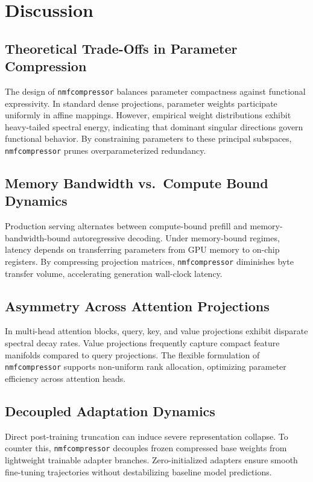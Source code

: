 \section{Discussion}

\subsection{Theoretical Trade-Offs in Parameter Compression}
The design of \texttt{nmfcompressor} balances parameter compactness against functional expressivity. In standard dense projections, parameter weights participate uniformly in affine mappings. However, empirical weight distributions exhibit heavy-tailed spectral energy, indicating that dominant singular directions govern functional behavior. By constraining parameters to these principal subspaces, \texttt{nmfcompressor} prunes overparameterized redundancy.

\subsection{Memory Bandwidth vs.\ Compute Bound Dynamics}
Production serving alternates between compute-bound prefill and memory-bandwidth-bound autoregressive decoding. Under memory-bound regimes, latency depends on transferring parameters from GPU memory to on-chip registers. By compressing projection matrices, \texttt{nmfcompressor} diminishes byte transfer volume, accelerating generation wall-clock latency.

\subsection{Asymmetry Across Attention Projections}
In multi-head attention blocks, query, key, and value projections exhibit disparate spectral decay rates. Value projections frequently capture compact feature manifolds compared to query projections. The flexible formulation of \texttt{nmfcompressor} supports non-uniform rank allocation, optimizing parameter efficiency across attention heads.

\subsection{Decoupled Adaptation Dynamics}
Direct post-training truncation can induce severe representation collapse. To counter this, \texttt{nmfcompressor} decouples frozen compressed base weights from lightweight trainable adapter branches. Zero-initialized adapters ensure smooth fine-tuning trajectories without destabilizing baseline model predictions.

